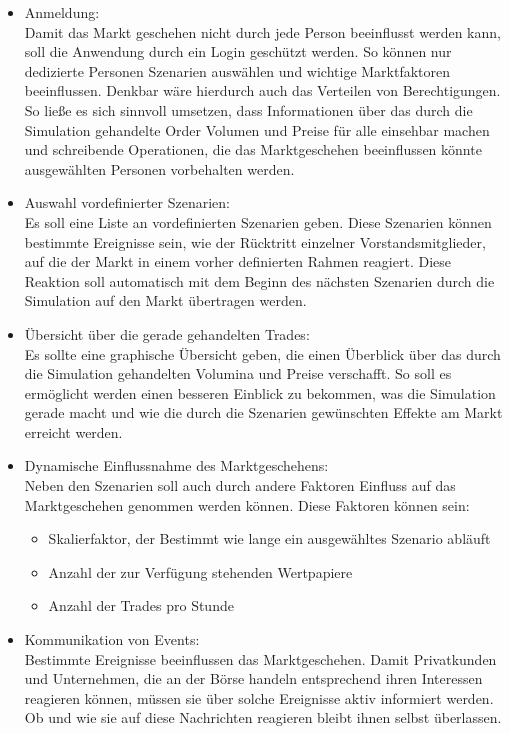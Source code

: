 	\begin{itemize}
		\item Anmeldung: \\
			Damit das Markt geschehen nicht durch jede Person beeinflusst werden kann, soll die Anwendung durch ein Login geschützt werden. So können nur dedizierte Personen Szenarien auswählen und wichtige Marktfaktoren beeinflussen. Denkbar wäre hierdurch auch das Verteilen von Berechtigungen. So ließe es sich sinnvoll umsetzen, dass Informationen über das durch die Simulation gehandelte Order Volumen und Preise für alle einsehbar machen und schreibende Operationen, die das Marktgeschehen beeinflussen könnte ausgewählten Personen vorbehalten werden.
		
		\item Auswahl vordefinierter Szenarien: \\
			Es soll eine Liste an vordefinierten Szenarien geben. Diese Szenarien können bestimmte Ereignisse sein, wie der Rücktritt einzelner Vorstandsmitglieder, auf die der Markt in einem vorher definierten Rahmen reagiert. Diese Reaktion soll automatisch mit dem Beginn des nächsten Szenarien durch die Simulation auf den Markt übertragen werden.
			
		\item Übersicht über die gerade gehandelten Trades: \\
			Es sollte eine graphische Übersicht geben, die einen Überblick über das durch die Simulation gehandelten Volumina und Preise verschafft. So soll es ermöglicht werden einen besseren Einblick zu bekommen, was die Simulation gerade macht und wie die durch die Szenarien gewünschten Effekte am Markt erreicht werden.
			
		\item Dynamische Einflussnahme des Marktgeschehens: \\
			Neben den Szenarien soll auch durch andere Faktoren Einfluss auf das Marktgeschehen genommen werden können. Diese Faktoren können sein:
				\begin{itemize}
					\item Skalierfaktor, der Bestimmt wie lange ein ausgewähltes Szenario abläuft
					\item Anzahl der zur Verfügung stehenden Wertpapiere
					\item Anzahl der Trades pro Stunde
				\end{itemize}
			
		\item Kommunikation von Events: \\
			Bestimmte Ereignisse beeinflussen das Marktgeschehen. Damit Privatkunden und Unternehmen, die an der Börse handeln entsprechend ihren Interessen reagieren können, müssen sie über solche Ereignisse aktiv informiert werden. Ob und wie sie auf diese Nachrichten reagieren bleibt ihnen selbst überlassen.
			

\end{itemize}
